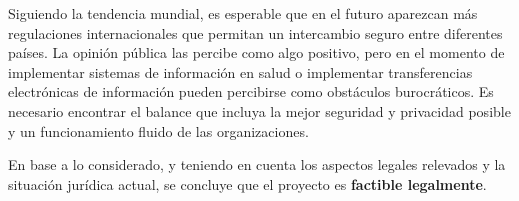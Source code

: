 Siguiendo la tendencia mundial, es esperable que en el futuro aparezcan más regulaciones internacionales que permitan un intercambio seguro entre diferentes países. La opinión pública las percibe como algo positivo, pero en el momento de implementar sistemas de información en salud o implementar transferencias electrónicas de información pueden percibirse como obstáculos burocráticos. Es necesario encontrar el balance que incluya la mejor seguridad y privacidad posible y un funcionamiento fluido de las organizaciones.

En base a lo considerado, y teniendo en cuenta los aspectos legales relevados y la situación jurídica actual, se concluye que el proyecto es \textbf{factible legalmente}.

